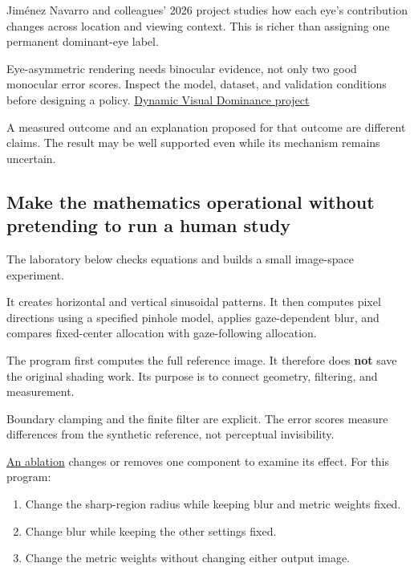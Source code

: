 Jiménez Navarro and colleagues' 2026 project studies how each eye's contribution changes across location and viewing context. This is richer than assigning one permanent dominant-eye label.

Eye-asymmetric rendering needs binocular evidence, not only two good monocular error scores. Inspect the model, dataset, and validation conditions before designing a policy. \href{https://dynamicvisualdominance.mpi-inf.mpg.de/}{Dynamic Visual Dominance project}

A measured outcome and an explanation proposed for that outcome are different claims. The result may be well supported even while its mechanism remains uncertain.

\subsection{Make the mathematics operational without pretending to run a human study}\label{04-visual-computing-ii-ch043-make-the-mathematics-operational-without-pretending-to-run-a-human-study}

The laboratory below checks equations and builds a small image-space experiment.

It creates horizontal and vertical sinusoidal patterns. It then computes pixel directions using a specified pinhole model, applies gaze-dependent blur, and compares fixed-center allocation with gaze-following allocation.

The program first computes the full reference image. It therefore does \textbf{not} save the original shading work. Its purpose is to connect geometry, filtering, and measurement.

Boundary clamping and the finite filter are explicit. The error scores measure differences from the synthetic reference, not perceptual invisibility.

\hyperref[appendix-65788587ef78]{An ablation} changes or removes one component to examine its effect. For this program:

\begin{enumerate}
\def\labelenumi{\arabic{enumi}.}
\tightlist
\item
  Change the sharp-region radius while keeping blur and metric weights fixed.
\item
  Change blur while keeping the other settings fixed.
\item
  Change the metric weights without changing either output image.
\end{enumerate}

